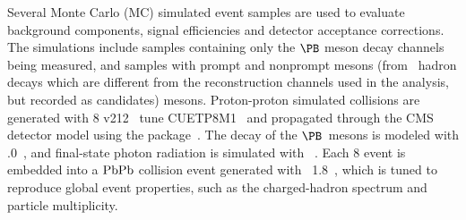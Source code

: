 Several Monte Carlo (MC) simulated event samples are used to evaluate background components, signal efficiencies and detector acceptance corrections. The simulations include samples containing only the $\PB$ meson decay channels being measured, and samples with prompt and nonprompt \PJGy mesons (from \PQb\ hadron decays which are different from the reconstruction channels used in the analysis, but recorded as candidates) mesons. Proton-proton simulated collisions are generated with {\PYTHIA}8 v212~\cite{Sjostrand:2014zea} tune CUETP8M1~\cite{Khachatryan:2015pea} and propagated through the CMS detector model using the \GEANTfour package~\cite{Allison:2016lfl}. The decay of the $\PB$~mesons is modeled with .0~\cite{Lange:2001uf}, and final-state photon radiation is simulated with ~\cite{Barberio:1990ms}. Each {\PYTHIA}8 event is embedded into a $\mathrm{PbPb}$ collision event generated with {\HYDJET}~1.8~\cite{Lokhtin:2005px}, which is tuned to reproduce global event properties, such as the charged-hadron \pt spectrum and particle multiplicity.

